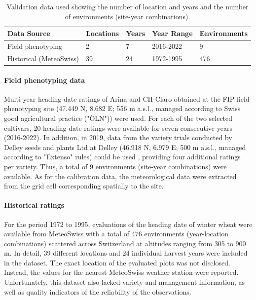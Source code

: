 \begin{table}[H]
\caption{Validation data used showing the number of location and years and the number of environments (site-year combinations).}
\centering
\label{tab:val-data}
\begin{tabular}{@{}lllll@{}}
\toprule
\textbf{Data Source}  & \textbf{Locations} & \textbf{Years} & \textbf{Year Range} & \textbf{Environments}   \\ \midrule
Field phenotyping    & 2        & 7    & 2016-2022 & 9 \\
Historical (MeteoSwiss) & 39        & 24    & 1972-1995  & 476  \\ \bottomrule
\end{tabular}
\end{table}

\paragraph{Field phenotyping data}
Multi-year heading date ratings of Arina and CH-Claro obtained at the FIP field phenotyping site \citep{kirchgessner_eth_2017} (47.449 N, 8.682 E; 556 m a.s.l., managed according to Swiss good agricultural practice ("ÖLN")) were used. For each of the two selected cultivars, 20 heading date ratings were available for seven consecutive years (2016-2022). In addition, in 2019, data from the variety trials conducted by Delley seeds and plants Ltd at Delley (46.918 N, 6.979 E; 500 m a.s.l., managed according to "Extenso" rules) could be used \citep{roth_image-based_2023}, providing four additional ratings per variety. Thus, a total of 9 environments (site-year combinations) were available. As for the calibration data, the meteorological data were extracted from the grid cell corresponding spatially to the site.

\paragraph{Historical ratings}
For the period 1972 to 1995, evaluations of the heading date of winter wheat were available from MeteoSwiss with a total of 476 environments (year-location combinations) scattered across Switzerland at altitudes ranging from 305 to 900 m. In detail, 39 different locations and 24 individual harvest years were included in the dataset. The exact location of the evaluated plots was not disclosed. Instead, the values for the nearest MeteoSwiss weather station were reported. Unfortunately, this dataset also lacked variety and management information, as well as quality indicators of the reliability of the observations.

